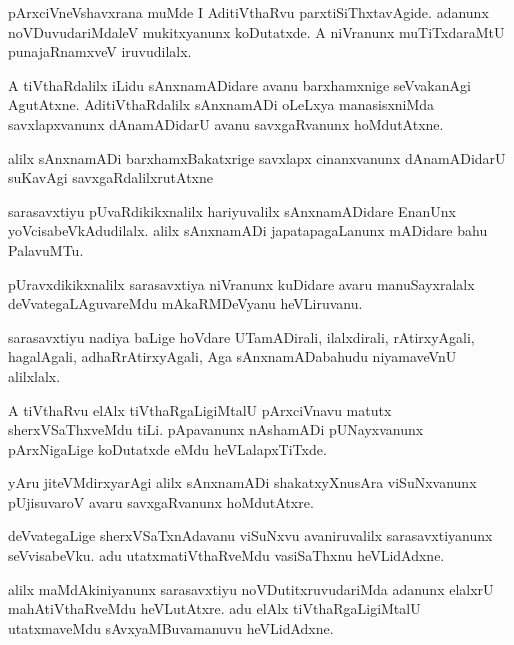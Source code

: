 \begin{mng}
pArxciVneVshavxrana muMde I AditiVthaRvu parxtiSiThxtavAgide. adanunx noVDuvudariMdaleV mukitxyanunx koDutatxde. A niVranunx muTiTxdaraMtU punajaRnamxveV iruvudilalx.
\end{mng}

\begin{mng}
A tiVthaRdalilx iLidu sAnxnamADidare avanu barxhamxnige seVvakanAgi AgutAtxne. AditiVthaRdalilx sAnxnamADi oLeLxya manasisxniMda savxlapxvanunx dAnamADidarU avanu savxgaRvanunx hoMdutAtxne.
\end{mng}

\begin{mng}
alilx sAnxnamADi barxhamxBakatxrige savxlapx cinanxvanunx dAnamADidarU suKavAgi savxgaRdalilxrutAtxne
\end{mng}

\begin{mng}
sarasavxtiyu pUvaRdikikxnalilx hariyuvalilx sAnxnamADidare EnanUnx yoVcisabeVkAdudilalx. alilx sAnxnamADi japatapagaLanunx mADidare bahu PalavuMTu.
\end{mng}

\begin{mng}
pUravxdikikxnalilx sarasavxtiya niVranunx kuDidare avaru manuSayxralalx deVvategaLAguvareMdu mAkaRMDeVyanu heVLiruvanu.
\end{mng}

\begin{mng}
sarasavxtiyu nadiya baLige hoVdare UTamADirali, ilalxdirali, rAtirxyAgali, hagalAgali, adhaRrAtirxyAgali, Aga sAnxnamADabahudu niyamaveVnU alilxlalx.
\end{mng}

\begin{mng}
A tiVthaRvu elAlx tiVthaRgaLigiMtalU pArxciVnavu matutx sherxVSaThxveMdu tiLi. pApavanunx nAshamADi pUNayxvanunx pArxNigaLige koDutatxde eMdu heVLalapxTiTxde.
\end{mng}

\begin{mng}
yAru jiteVMdirxyarAgi alilx sAnxnamADi shakatxyXnusAra viSuNxvanunx pUjisuvaroV avaru savxgaRvanunx hoMdutAtxre.
\end{mng}

\begin{mng}
deVvategaLige sherxVSaTxnAdavanu viSuNxvu avaniruvalilx sarasavxtiyanunx seVvisabeVku. adu utatxmatiVthaRveMdu vasiSaThxnu heVLidAdxne.
\end{mng}

\begin{mng}
alilx maMdAkiniyanunx sarasavxtiyu noVDutitxruvudariMda adanunx elalxrU mahAtiVthaRveMdu heVLutAtxre. adu elAlx tiVthaRgaLigiMtalU utatxmaveMdu sAvxyaMBuvamanuvu heVLidAdxne.
\end{mng}

